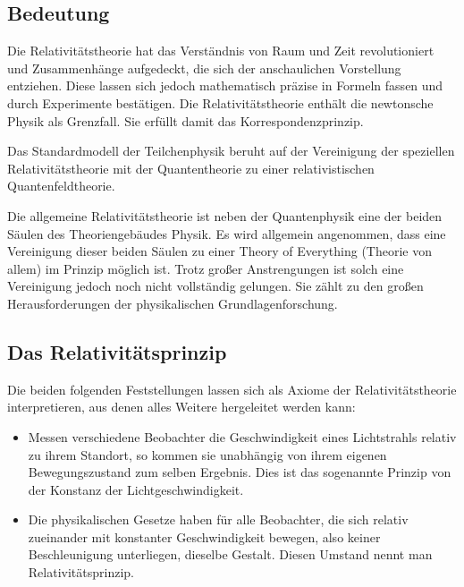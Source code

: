 \documentclass[12pt,a4paper,twoside]{article}
\newenvironment{nohyphens}{%
  \par
  \hyphenpenalty=10000
  \exhyphenpenalty=10000
  \sloppy
}{\par}
\newcommand{\Lf}{
  \setlength{\itemsep}{1pt}
  \setlength{\parskip}{0pt}
  \setlength{\parsep}{0pt}
}
\begin{document}
\begin{nohyphens}
\subsection*{Bedeutung}

Die Relativitätstheorie hat das Verständnis von Raum und Zeit revolutioniert und Zusammenhänge aufgedeckt, die sich der anschaulichen Vorstellung entziehen. Diese lassen sich jedoch mathematisch präzise in Formeln fassen und durch Experimente bestätigen. Die Relativitätstheorie enthält die newtonsche Physik als Grenzfall. Sie erfüllt damit das Korrespondenzprinzip.

Das Standardmodell der Teilchenphysik beruht auf der Vereinigung der speziellen Relativitätstheorie mit der Quantentheorie zu einer relativistischen Quantenfeldtheorie.

Die allgemeine Relativitätstheorie ist neben der Quantenphysik eine der beiden Säulen des Theoriengebäudes Physik. Es wird allgemein angenommen, dass eine Vereinigung dieser beiden Säulen zu einer Theory of Everything (Theorie von allem) im Prinzip möglich ist. Trotz großer Anstrengungen ist solch eine Vereinigung jedoch noch nicht vollständig gelungen. Sie zählt zu den großen Herausforderungen der physikalischen Grundlagenforschung.

\subsection{Das Relativitätsprinzip}

Die beiden folgenden Feststellungen lassen sich als Axiome der Relativitätstheorie interpretieren, aus denen alles Weitere hergeleitet werden kann:

\begin{itemize}\Lf
  \item Messen verschiedene Beobachter die Geschwindigkeit eines Lichtstrahls relativ zu ihrem Standort, so kommen sie unabhängig von ihrem eigenen Bewegungszustand zum selben Ergebnis. Dies ist das sogenannte Prinzip von der Konstanz der Lichtgeschwindigkeit.
  \item Die physikalischen Gesetze haben für alle Beobachter, die sich relativ zueinander mit konstanter Geschwindigkeit bewegen, also keiner Beschleunigung unterliegen, dieselbe Gestalt. Diesen Umstand nennt man Relativitätsprinzip.
\end{itemize}


\end{nohyphens}
\end{document}
